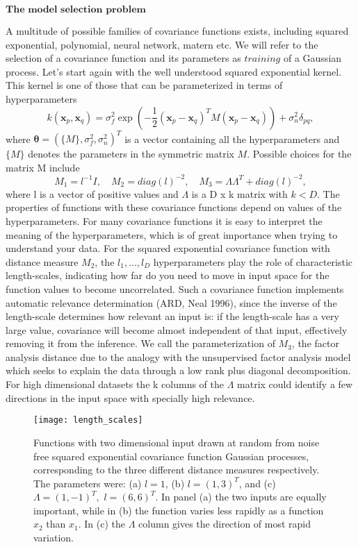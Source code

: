 \documentclass[12pt,a4paper,oneside]{book}
\theoremstyle{plain}
\theoremstyle{definition}
\begin{document}
{\vspace{3mm}
\begin{flushleft}
$\textbf{The model selection problem}$
\end{flushleft}
\vspace{3mm}
A multitude of possible families of covariance functions exists, including squared exponential, polynomial, neural network, matern etc. We will refer to the selection of a covariance function and its parameters as $\textit{training}$ of a Gaussian process. 
\vspace{3mm}\newline
Let's start again with the well understood squared exponential kernel. This kernel is one of those that can be parameterized in terms of hyperparameters $$k(\bm{x}_p,\bm{x}_q)=\sigma_f^2\exp(-\frac{1}{2}(\bm{x}_p-\bm{x}_q)^TM(\bm{x}_p-\bm{x}_q))+ \sigma_n^2 \delta_{pq},$$ where $\bm{\theta}=(\lbrace M\rbrace, \sigma_f^2,\sigma_n^2)^T$ is a vector containing all the hyperparameters and $\lbrace M \rbrace$ denotes the parameters in the symmetric matrix $M$. Possible choices for the matrix M include $$M_1=l^{-1}I,\quad M_2=diag(l)^{-2},\quad M_3=\Lambda\Lambda^T + diag(l)^{-2},$$ where l is a vector of positive values and $\Lambda$ is a D x k matrix with $k<D$. The properties of functions with these covariance functions depend on values of the hyperparameters. For many covariance functions it is easy to interpret the meaning of the hyperparameters, which is of great importance when trying to understand your data. For the squared exponential covariance function with distance measure $M_2$, the $l_1,...,l_D$ hyperparameters play the role of characteristic length-scales, indicating how far do you need to move in input space for the function values to become uncorrelated. Such a covariance function implements automatic relevance determination (ARD, Neal 1996), since the inverse of the length-scale determines how relevant an input is: if the length-scale has a very large value, covariance will become almost independent of that input, effectively removing it from the inference. We call the parameterization of $M_3$, the factor analysis distance due to the analogy with the unsupervised factor analysis model which seeks to explain the data through a low rank plus diagonal decomposition. For high dimensional datasets the k columns of the $\Lambda$ matrix could identify a few directions in the input space with specially high relevance.  
\begin{figure}[h] 
\begin{center}
\texttt{[image: length\_scales]}
\caption{Functions with two dimensional input drawn at random from noise free squared exponential covariance function Gaussian processes, corresponding to the three different distance measures respectively. The parameters were: (a) $l=1$, (b) $l=(1,3)^T$, and (c) $\Lambda=(1,-1)^T,$ $l=(6,6)^T$. In panel (a) the two inputs are equally important, while in (b) the function varies less rapidly as a function $x_2$ than $x_1.$ In (c) the $\Lambda$ column gives the direction of most rapid variation.}
\end{center}
\end{figure}

}
\end{document}
